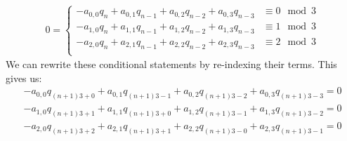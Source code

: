 \documentclass[a4paper]{article}
\theoremstyle{definition}
\begin{document}
\begin{align*}
0=
\begin{cases}
-a_{0,0}q_{n}+a_{0,1}q_{n-1}+a_{0,2}q_{n-2}+a_{0,3}q_{n-3} & \equiv 0 \mod 3 \\
-a_{1,0}q_{n}+a_{1,1}q_{n-1}+a_{1,2}q_{n-2}+a_{1,3}q_{n-3} & \equiv 1 \mod 3 \\
-a_{2,0}q_{n}+a_{2,1}q_{n-1}+a_{2,2}q_{n-2}+a_{2,3}q_{n-3} & \equiv 2 \mod 3 \\
\end{cases}
\end{align*}
We can rewrite these conditional statements by re-indexing their terms. This gives us:
\begin{align*}
-a_{0,0}q_{(n+1)3+0}+a_{0,1}q_{(n+1)3-1}
+a_{0,2}q_{(n+1)3-2}+a_{0,3}q_{(n+1)3-3} = 0 \\
-a_{1,0}q_{(n+1)3+1}+a_{1,1}q_{(n+1)3+0}
+a_{1,2}q_{(n+1)3-1}+a_{1,3}q_{(n+1)3-2} = 0 \\
-a_{2,0}q_{(n+1)3+2}+a_{2,1}q_{(n+1)3+1}
+a_{2,2}q_{(n+1)3-0}+a_{2,3}q_{(n+1)3-1} = 0
\end{align*}
\end{document}

